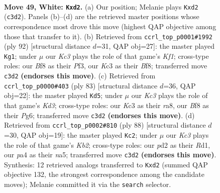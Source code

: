 \documentclass[11pt]{article}
\begin{document}
\clearpage

\begin{figure}[p]\centering
\begin{subfigure}{0.46\textwidth}\centering
\resizebox{\linewidth}{!}{%
\newchessgame
\chessboard[
  setfen={5B2/5p1k/5n2/8/p3p2p/P1K4P/1P1p1PR1/1r6 w - - 0 49},
  showmover=false,
  pgfstyle=straightmove, color=movearrow, markmove={c3-d2}
]}
\caption{}
\end{subfigure}\hfill
\begin{subfigure}{0.46\textwidth}\centering
\resizebox{\linewidth}{!}{%
\newchessgame
\chessboard[
  setfen={5B2/8/5n1p/1p1k2p1/5pP1/P4P1P/7r/4RK2 w - - 11 47},
  showmover=false,
  pgfstyle=straightmove, color=movearrow, markmove={f1-g1}
]}
\caption{}
\end{subfigure}
\\[4pt]
\begin{subfigure}{0.46\textwidth}\centering
\resizebox{\linewidth}{!}{%
\newchessgame
\chessboard[
  setfen={R7/p4r1p/3k2pP/2p5/3p1P2/PP6/2PK4/8 b - - 0 42},
  showmover=false,
  pgfstyle=straightmove, color=movearrow, markmove={d6-d5}
]}
\caption{}
\end{subfigure}\hfill
\begin{subfigure}{0.46\textwidth}\centering
\resizebox{\linewidth}{!}{%
\newchessgame
\chessboard[
  setfen={1k3r2/1p4p1/7p/n2pPB1P/Pp1P2P1/8/1K6/3R4 w - - 2 45},
  showmover=false,
  pgfstyle=straightmove, color=movearrow, markmove={b2-c2}
]}
\caption{}
\end{subfigure}
\caption{\textbf{Move 49, White: \texttt{Kxd2}.} (a) Our position; Melanie plays \texttt{Kxd2} (\texttt{c3d2}). Panels (b)--(d) are the retrieved master positions whose correspondence most drove this move (highest QAP objective among those that transfer to it). (b) Retrieved from \texttt{ccrl\_top\_p0001\#1992} (ply 92) [structural distance $d$=31, QAP obj=27]: the master played \texttt{Kg1}; under $\mu$ our \emph{Kc3} plays the role of that game's \emph{Kf1}; cross-type roles: our \emph{B}f8 as their \emph{P}f3, our \emph{K}c3 as their \emph{B}f8; transferred move \texttt{c3d2} \textbf{(endorses this move)}. (c) Retrieved from \texttt{ccrl\_top\_p0000\#403} (ply 83) [structural distance $d$=36, QAP obj=22]: the master played \texttt{Kd5}; under $\mu$ our \emph{Kc3} plays the role of that game's \emph{Kd3}; cross-type roles: our \emph{K}c3 as their \emph{r}a8, our \emph{B}f8 as their \emph{P}g6; transferred move \texttt{c3d2} \textbf{(endorses this move)}. (d) Retrieved from \texttt{ccrl\_top\_p0002\#810} (ply 88) [structural distance $d$=30, QAP obj=19]: the master played \texttt{Kc2}; under $\mu$ our \emph{Kc3} plays the role of that game's \emph{Kb2}; cross-type roles: our \emph{p}d2 as their \emph{R}d1, our \emph{p}a4 as their \emph{n}a5; transferred move \texttt{c3d2} \textbf{(endorses this move)}. Synthesis: 12 retrieved analogs transferred to \texttt{Kxd2} (summed QAP objective 132, the strongest correspondence among the candidate moves); Melanie committed it via the \texttt{search} selector.}
\label{fig:thought-m96}
\end{figure}
\end{document}
